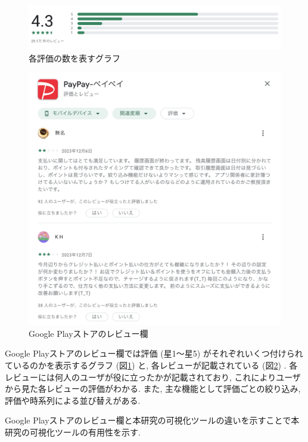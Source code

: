 \begin{figure}[H]
  \centering
  \includegraphics[scale=0.4]
    {contents/images/google_play_graph.png}
  \caption{各評価の数を表すグラフ\label{fig:google_play_graph}}
\end{figure}

\begin{figure}[H]
  \centering
  \includegraphics[scale=0.4]
    {contents/images/google_play.png}
  \caption{Google Playストアのレビュー欄\label{fig:google_play}}
\end{figure}

Google Playストアのレビュー欄では評価 (星1〜星5) がそれぞれいくつ付けられているのかを表示するグラフ (図\ref{fig:google_play_graph}) と, 各レビューが記載されている (図\ref{fig:google_play}) . 各レビューには何人のユーザが役に立ったかが記載されており, これによりユーザから見た各レビューの評価がわかる. 
また, 主な機能として評価ごとの絞り込み, 評価や時系列による並び替えがある. 

Google Playストアのレビュー欄と本研究の可視化ツールの違いを示すことで本研究の可視化ツールの有用性を示す. 

